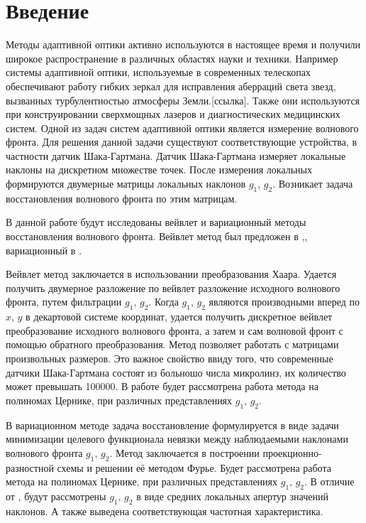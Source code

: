\documentclass{article}
\begin{document}
\newpage


\newpage
\section*{Введение}
Методы адаптивной оптики активно используются в настоящее время и получили широкое распространение в различных областях науки и техники. Например системы адаптивной оптики, используемые в современных телескопах обеспечивают работу гибких зеркал для исправления аберраций света звезд, вызванных турбулентностью атмосферы Земли.[ссылка]. Также они используются при конструировании сверхмощных лазеров и диагностических медицинских систем. Одной из задач систем адаптивной оптики является измерение волнового фронта. Для решения данной задачи существуют соответствующие устройства, в частности датчик Шака-Гартмана. Датчик Шака-Гартмана измеряет локальные наклоны на дискретном множестве точек. После измерения локальных формируются двумерные матрицы локальных наклонов $g_1$, $g_2$. Возникает задача восстановления волнового фронта по этим матрицам.

В данной работе будут исследованы вейвлет и вариационный методы восстановления волнового фронта. Вейвлет метод был предложен в \cite{new_method1},\cite{new_method2}, вариационный в \cite{vatiational_base}.

Вейвлет метод заключается в использовании преобразования Хаара. Удается получить двумерное разложение по вейвлет разложение исходного волнового фронта, путем фильтрации $g_1$, $g_2$. Когда $g_1,\,g_2$ являются производными вперед по $x,\,y$ в декартовой системе координат, удается получить дискретное вейвлет преобразование исходного волнового фронта, а затем и сам волновой фронт с помощью обратного преобразования. Метод позволяет работать с матрицами произвольных размеров. Это важное свойство ввиду того, что современные датчики Шака-Гартмана состоят из больношо числа микролинз, их количество может превышать 100000. 
В работе будет рассмотрена работа метода на полиномах Цернике, при различных представлениях $g_1,\,g_2$.

В вариационном методе задача восстановление формулируется в виде задачи минимизации целевого функционала невязки между наблюдаемыми наклонами волнового фронта $g_1,\,g_2$. Метод заключается в построении проекционно-разностной схемы и решении её методом Фурье. Будет рассмотрена работа метода на полиномах Цернике, при различных представлениях $g_1,\,g_2$. В отличие от \cite{vatiational_base}, будут рассмотрены $g_1,\,g_2$ в виде средних локальных апертур значений наклонов. А также выведена соответствующая частотная характеристика.
\newpage
\end{document}
